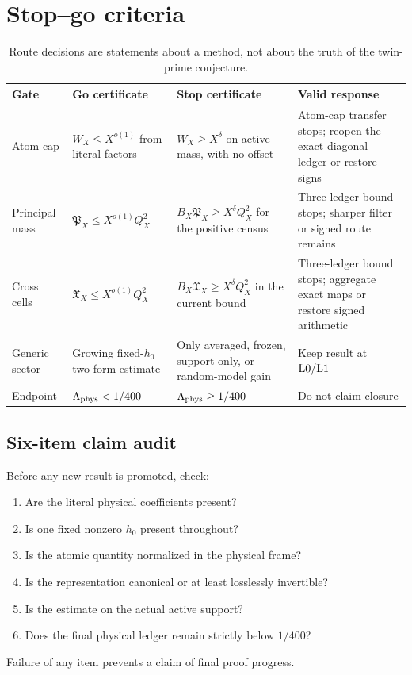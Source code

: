\section{Stop--go criteria}
\label{sec:stop-go}

\begin{table}[ht]
\centering
\small
\begin{tabularx}{\textwidth}{@{}
 >{\raggedright\arraybackslash}p{}
 >{\raggedright\arraybackslash}p{}
 >{\raggedright\arraybackslash}p{}
 >{\raggedright\arraybackslash}X@{}}
\toprule
Gate & Go certificate & Stop certificate & Valid response\\
\midrule
Atom cap &
\(W_X\le X^{o(1)}\) from literal factors &
\(W_X\ge X^{\delta}\) on active mass, with no offset &
Atom-cap transfer stops; reopen the exact diagonal ledger or restore signs
\\
Principal mass &
\(\mathfrak P_X\le X^{o(1)}Q_X^2\) &
\(B_X\mathfrak P_X\ge X^\delta Q_X^2\) for the positive census &
Three-ledger bound stops; sharper filter or signed route remains
\\
Cross cells &
\(\mathfrak X_X\le X^{o(1)}Q_X^2\) &
\(B_X\mathfrak X_X\ge X^\delta Q_X^2\) in the current bound &
Three-ledger bound stops; aggregate exact maps or restore signed arithmetic
\\
Generic sector &
Growing fixed-\(h_0\) two-form estimate &
Only averaged, frozen, support-only, or random-model gain &
Keep result at \(\mathrm{L0}/\mathrm{L1}\)
\\
Endpoint &
\(\Lambda_{\rm phys}<1/400\) &
\(\Lambda_{\rm phys}\ge1/400\) &
Do not claim closure
\\
\bottomrule
\end{tabularx}
\caption{Route decisions are statements about a method, not about
the truth of the twin-prime conjecture.}
\label{tab:stop-go}
\end{table}

\subsection{Six-item claim audit}

Before any new result is promoted, check:
\begin{enumerate}[leftmargin=2em]
\item Are the literal physical coefficients present?
\item Is one fixed nonzero \(h_0\) present throughout?
\item Is the atomic quantity normalized in the physical frame?
\item Is the representation canonical or at least losslessly
  invertible?
\item Is the estimate on the actual active support?
\item Does the final physical ledger remain strictly below
  \(1/400\)?
\end{enumerate}
Failure of any item prevents a claim of final proof progress.

